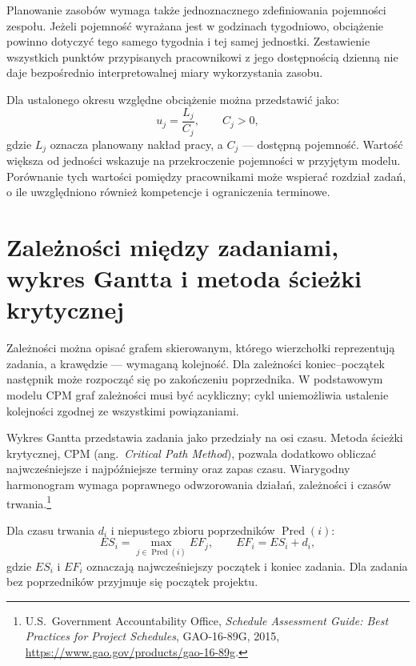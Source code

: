 Planowanie zasobów wymaga także jednoznacznego zdefiniowania pojemności zespołu. Jeżeli pojemność wyrażana jest w godzinach tygodniowo, obciążenie powinno dotyczyć tego samego tygodnia i tej samej jednostki. Zestawienie wszystkich punktów przypisanych pracownikowi z jego dostępnością dzienną nie daje bezpośrednio interpretowalnej miary wykorzystania zasobu.

Dla ustalonego okresu względne obciążenie można przedstawić jako:
\begin{equation}
    u_j = \frac{L_j}{C_j},
    \qquad C_j > 0,
    \label{eq:wzgledne-obciazenie}
\end{equation}
gdzie \(L_j\) oznacza planowany nakład pracy, a \(C_j\) --- dostępną pojemność. Wartość większa od jedności wskazuje na przekroczenie pojemności w przyjętym modelu. Porównanie tych wartości pomiędzy pracownikami może wspierać rozdział zadań, o ile uwzględniono również kompetencje i ograniczenia terminowe.


\section{Zależności między zadaniami, wykres Gantta i metoda ścieżki krytycznej}
\label{sec:sciezka-krytyczna}

Zależności można opisać grafem skierowanym, którego wierzchołki reprezentują zadania, a krawędzie --- wymaganą kolejność. Dla zależności koniec--początek następnik może rozpocząć się po zakończeniu poprzednika. W podstawowym modelu CPM graf zależności musi być acykliczny; cykl uniemożliwia ustalenie kolejności zgodnej ze wszystkimi powiązaniami.

Wykres Gantta przedstawia zadania jako przedziały na osi czasu. Metoda ścieżki krytycznej, CPM (ang.~\textit{Critical Path Method}), pozwala dodatkowo obliczać najwcześniejsze i najpóźniejsze terminy oraz zapas czasu. Wiarygodny harmonogram wymaga poprawnego odwzorowania działań, zależności i czasów trwania.\footnote{U.S.~Government Accountability Office, \textit{Schedule Assessment Guide: Best Practices for Project Schedules}, GAO-16-89G, 2015, \url{https://www.gao.gov/products/gao-16-89g}.}

Dla czasu trwania \(d_i\) i niepustego zbioru poprzedników \(\operatorname{Pred}(i)\):
\begin{equation}
    ES_i = \max_{j \in \operatorname{Pred}(i)} EF_j,
    \qquad
    EF_i = ES_i + d_i,
    \label{eq:cpm-przejscie-w-przod}
\end{equation}
gdzie \(ES_i\) i \(EF_i\) oznaczają najwcześniejszy początek i koniec zadania. Dla zadania bez poprzedników przyjmuje się początek projektu.

